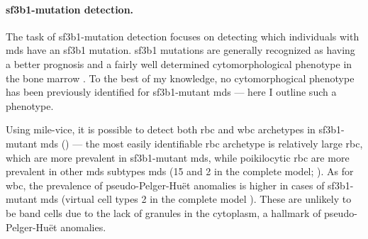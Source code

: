 \begin{figure}[!ht]
    \label{fig:rbc-disease-classification-examples}
\end{figure}

\begin{figure}[!ht]
    \label{fig:wbc-disease-classification-examples}
\end{figure}

\paragraph{\ac{sf3b1}-mutation detection.} The task of \ac{sf3b1}-mutation detection focuses on detecting which individuals with \ac{mds} have an \ac{sf3b1} mutation. \Ac{sf3b1} mutations are generally recognized as having a better prognosis and a fairly well determined cytomorphological phenotype in the bone marrow \cite{Malcovati2020-no,Hellstrom_Lindberg2015-zs,Malcovati2015-tz}. To the best of my knowledge, no cytomorphogical phenotype has been previously identified for \ac{sf3b1}-mutant \ac{mds} --- here I outline such a phenotype. 

Using \ac{mile-vice}, it is possible to detect both \ac{rbc} and \ac{wbc} archetypes in \ac{sf3b1}-mutant \ac{mds} () --- the most easily identifiable \ac{rbc} archetype is relatively large \ac{rbc}, which are more prevalent in \ac{sf3b1}-mutant \ac{mds}, while poikilocytic \ac{rbc} are more prevalent in other \ac{mds} subtypes \ac{mds} (15 and 2 in the complete model; ). As for \ac{wbc}, the prevalence of pseudo-Pelger-Huët anomalies is higher in cases of \ac{sf3b1}-mutant \ac{mds} (virtual cell types 2 in the complete model ). These are unlikely to be band cells due to the lack of granules in the cytoplasm, a hallmark of pseudo-Pelger-Huët anomalies.

